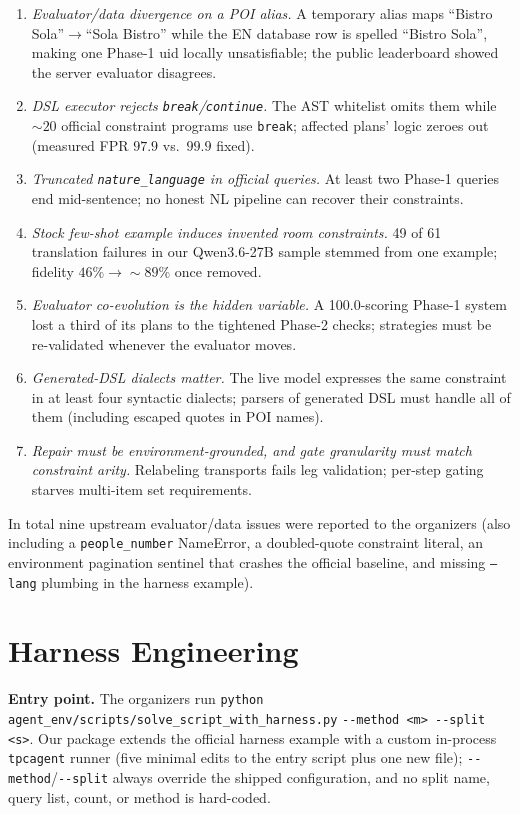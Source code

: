 \documentclass{article}
\begin{document}
\begin{enumerate}[leftmargin=1.3em,itemsep=1pt]
\item \emph{Evaluator/data divergence on a POI alias.} A temporary alias
maps ``Bistro Sola''$\to$``Sola Bistro'' while the EN database row is
spelled ``Bistro Sola'', making one Phase-1 uid locally unsatisfiable;
the public leaderboard showed the server evaluator disagrees.
\item \emph{DSL executor rejects \texttt{break}/\texttt{continue}.} The
AST whitelist omits them while ${\sim}20$ official constraint programs use
\texttt{break}; affected plans' logic zeroes out (measured FPR $97.9$ vs.\
$99.9$ fixed).
\item \emph{Truncated \texttt{nature\_language} in official queries.} At
least two Phase-1 queries end mid-sentence; no honest NL pipeline can
recover their constraints.
\item \emph{Stock few-shot example induces invented room constraints.}
49 of 61 translation failures in our Qwen3.6-27B sample stemmed from one
example; fidelity $46\%\!\to\!{\sim}89\%$ once removed.
\item \emph{Evaluator co-evolution is the hidden variable.} A
100.0-scoring Phase-1 system lost a third of its plans to the tightened
Phase-2 checks; strategies must be re-validated whenever the evaluator
moves.
\item \emph{Generated-DSL dialects matter.} The live model expresses the
same constraint in at least four syntactic dialects; parsers of generated
DSL must handle all of them (including escaped quotes in POI names).
\item \emph{Repair must be environment-grounded, and gate granularity must
match constraint arity.} Relabeling transports fails leg validation;
per-step gating starves multi-item set requirements.
\end{enumerate}

In total nine upstream evaluator/data issues were reported to the
organizers (also including a \texttt{people\_number} NameError, a
doubled-quote constraint literal, an environment pagination sentinel that
crashes the official baseline, and missing \texttt{--lang} plumbing in the
harness example).

\section{Harness Engineering}

\textbf{Entry point.} The organizers run
\lstinline|python agent_env/scripts/solve_script_with_harness.py|
\lstinline|--method <m> --split <s>|. Our package extends the official
harness example with a custom in-process \texttt{tpcagent} runner (five
minimal edits to the entry script plus one new file);
\lstinline|--method|/\lstinline|--split| always override the shipped
configuration, and no split name, query list, count, or method is
hard-coded.
\end{document}
